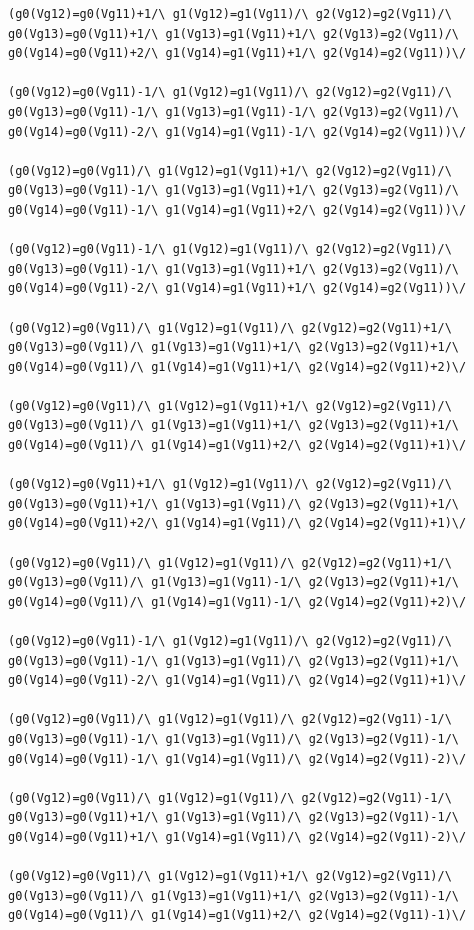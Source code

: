 \begin{appendices}
\begin{lstlisting}
(g0(Vg12)=g0(Vg11)+1/\ g1(Vg12)=g1(Vg11)/\ g2(Vg12)=g2(Vg11)/\ g0(Vg13)=g0(Vg11)+1/\ g1(Vg13)=g1(Vg11)+1/\ g2(Vg13)=g2(Vg11)/\ g0(Vg14)=g0(Vg11)+2/\ g1(Vg14)=g1(Vg11)+1/\ g2(Vg14)=g2(Vg11))\/ 

(g0(Vg12)=g0(Vg11)-1/\ g1(Vg12)=g1(Vg11)/\ g2(Vg12)=g2(Vg11)/\ g0(Vg13)=g0(Vg11)-1/\ g1(Vg13)=g1(Vg11)-1/\ g2(Vg13)=g2(Vg11)/\ g0(Vg14)=g0(Vg11)-2/\ g1(Vg14)=g1(Vg11)-1/\ g2(Vg14)=g2(Vg11))\/ 

(g0(Vg12)=g0(Vg11)/\ g1(Vg12)=g1(Vg11)+1/\ g2(Vg12)=g2(Vg11)/\ g0(Vg13)=g0(Vg11)-1/\ g1(Vg13)=g1(Vg11)+1/\ g2(Vg13)=g2(Vg11)/\ g0(Vg14)=g0(Vg11)-1/\ g1(Vg14)=g1(Vg11)+2/\ g2(Vg14)=g2(Vg11))\/ 

(g0(Vg12)=g0(Vg11)-1/\ g1(Vg12)=g1(Vg11)/\ g2(Vg12)=g2(Vg11)/\ g0(Vg13)=g0(Vg11)-1/\ g1(Vg13)=g1(Vg11)+1/\ g2(Vg13)=g2(Vg11)/\ g0(Vg14)=g0(Vg11)-2/\ g1(Vg14)=g1(Vg11)+1/\ g2(Vg14)=g2(Vg11))\/ 

(g0(Vg12)=g0(Vg11)/\ g1(Vg12)=g1(Vg11)/\ g2(Vg12)=g2(Vg11)+1/\ g0(Vg13)=g0(Vg11)/\ g1(Vg13)=g1(Vg11)+1/\ g2(Vg13)=g2(Vg11)+1/\ g0(Vg14)=g0(Vg11)/\ g1(Vg14)=g1(Vg11)+1/\ g2(Vg14)=g2(Vg11)+2)\/ 

(g0(Vg12)=g0(Vg11)/\ g1(Vg12)=g1(Vg11)+1/\ g2(Vg12)=g2(Vg11)/\ g0(Vg13)=g0(Vg11)/\ g1(Vg13)=g1(Vg11)+1/\ g2(Vg13)=g2(Vg11)+1/\ g0(Vg14)=g0(Vg11)/\ g1(Vg14)=g1(Vg11)+2/\ g2(Vg14)=g2(Vg11)+1)\/ 

(g0(Vg12)=g0(Vg11)+1/\ g1(Vg12)=g1(Vg11)/\ g2(Vg12)=g2(Vg11)/\ g0(Vg13)=g0(Vg11)+1/\ g1(Vg13)=g1(Vg11)/\ g2(Vg13)=g2(Vg11)+1/\ g0(Vg14)=g0(Vg11)+2/\ g1(Vg14)=g1(Vg11)/\ g2(Vg14)=g2(Vg11)+1)\/ 

(g0(Vg12)=g0(Vg11)/\ g1(Vg12)=g1(Vg11)/\ g2(Vg12)=g2(Vg11)+1/\ g0(Vg13)=g0(Vg11)/\ g1(Vg13)=g1(Vg11)-1/\ g2(Vg13)=g2(Vg11)+1/\ g0(Vg14)=g0(Vg11)/\ g1(Vg14)=g1(Vg11)-1/\ g2(Vg14)=g2(Vg11)+2)\/ 

(g0(Vg12)=g0(Vg11)-1/\ g1(Vg12)=g1(Vg11)/\ g2(Vg12)=g2(Vg11)/\ g0(Vg13)=g0(Vg11)-1/\ g1(Vg13)=g1(Vg11)/\ g2(Vg13)=g2(Vg11)+1/\ g0(Vg14)=g0(Vg11)-2/\ g1(Vg14)=g1(Vg11)/\ g2(Vg14)=g2(Vg11)+1)\/ 

(g0(Vg12)=g0(Vg11)/\ g1(Vg12)=g1(Vg11)/\ g2(Vg12)=g2(Vg11)-1/\ g0(Vg13)=g0(Vg11)-1/\ g1(Vg13)=g1(Vg11)/\ g2(Vg13)=g2(Vg11)-1/\ g0(Vg14)=g0(Vg11)-1/\ g1(Vg14)=g1(Vg11)/\ g2(Vg14)=g2(Vg11)-2)\/ 

(g0(Vg12)=g0(Vg11)/\ g1(Vg12)=g1(Vg11)/\ g2(Vg12)=g2(Vg11)-1/\ g0(Vg13)=g0(Vg11)+1/\ g1(Vg13)=g1(Vg11)/\ g2(Vg13)=g2(Vg11)-1/\ g0(Vg14)=g0(Vg11)+1/\ g1(Vg14)=g1(Vg11)/\ g2(Vg14)=g2(Vg11)-2)\/ 

(g0(Vg12)=g0(Vg11)/\ g1(Vg12)=g1(Vg11)+1/\ g2(Vg12)=g2(Vg11)/\ g0(Vg13)=g0(Vg11)/\ g1(Vg13)=g1(Vg11)+1/\ g2(Vg13)=g2(Vg11)-1/\ g0(Vg14)=g0(Vg11)/\ g1(Vg14)=g1(Vg11)+2/\ g2(Vg14)=g2(Vg11)-1)\/ 


\end{lstlisting}
\end{appendices}
